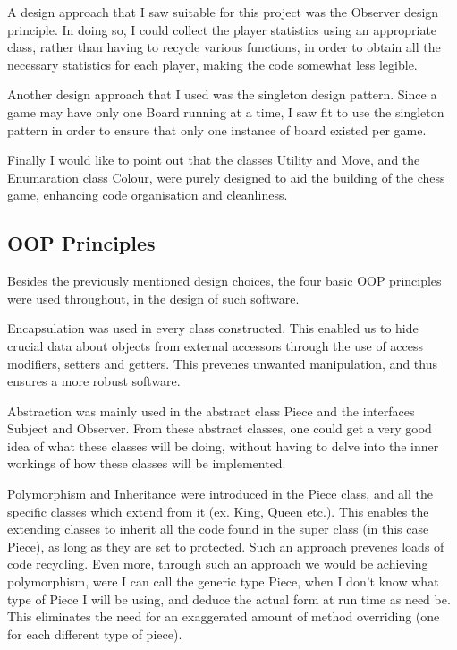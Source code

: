 \documentclass[12pt, A4]{report}
\begin{document}
		\par
		A design approach that I saw suitable for this project was the Observer design principle. In doing so, I could collect the player statistics using an appropriate class, rather than having to recycle various functions, in order to obtain all the necessary statistics for each player, making the code somewhat less legible.

		\par
		Another design approach that I used was the singleton design pattern. Since a game may have only one Board running at a time, I saw fit to use the singleton pattern in order to ensure that only one instance of board existed per game.

		\par
		Finally I would like to point out that the classes Utility and Move, and the Enumaration class Colour, were purely designed to aid the building of the chess game, enhancing code organisation and cleanliness.

		\subsection*{OOP Principles}
		Besides the previously mentioned design choices, the four basic OOP principles were used throughout, in the design of such software.
		\par
		Encapsulation was used in every class constructed. This enabled us to hide crucial data about objects from external accessors through the use of access modifiers, setters and getters. This prevenes unwanted manipulation, and thus ensures a more robust software.
		\par
		Abstraction was mainly used in the abstract class Piece and the interfaces Subject and Observer. From these abstract classes, one could get a very good idea of what these classes will be doing, without having to delve into the inner workings of how these classes will be implemented.
		\par
		Polymorphism and Inheritance were introduced in the Piece class, and all the specific classes which extend from it (ex. King, Queen etc.). This enables the extending classes to inherit all the code found in the super class (in this case Piece), as long as they are set to protected. Such an approach prevenes loads of code recycling. Even more, through such an approach we would be achieving polymorphism, were I can call the generic type Piece, when I don't know what type of Piece I will be using, and deduce the actual form at run time as need be. This eliminates the need for an exaggerated amount of method overriding (one for each different type of piece).
\end{document}

